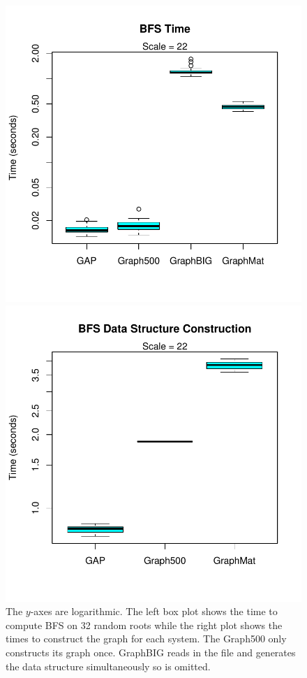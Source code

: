 \documentclass[conference]{IEEEtran}
\begin{document}
\begin{figure}
	\centering
	\begin{minipage}{0.48\linewidth}
		\includegraphics[width=\linewidth, trim=0 36pt 18pt 0, clip]{graphics/bfs_time.pdf}
	\end{minipage}
	\begin{minipage}{0.48\linewidth}
		\includegraphics[width=\linewidth, trim=0 36pt 18pt 0, clip]{graphics/bfs_dsc.pdf}
	\end{minipage}
	\caption{The $y$-axes are logarithmic. The left box plot shows the time to compute BFS on 32 random roots while the right plot shows the times to construct the graph for each system. The Graph500 only constructs its graph once. GraphBIG reads in the file and generates the data structure simultaneously so is omitted.}
	\label{fig:bfs-time}
\end{figure}
\end{document}
